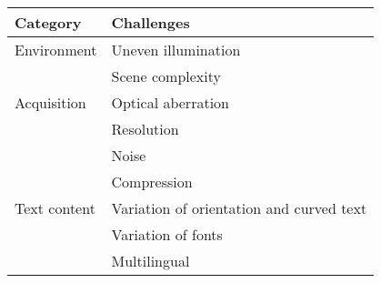 \begin{center} \label{Chalenges}
\begin{tabular}{|l|l|}
\hline 
\textbf{Category} &\textbf{Challenges} \\ 
\hline 
Environment &Uneven illumination \\ 
	\cline{2-2} 
 	&Scene complexity \\ 
\hline 
Acquisition &Optical aberration \\ 
 	\cline{2-2} 
	 &Resolution \\  	
 	\cline{2-2} 
	 &Noise \\ 	 
 	\cline{2-2} 
	 &Compression \\ 	 
\hline 
Text content &Variation of orientation and curved text \\ 
	\cline{2-2}  
	 &Variation of fonts \\ 
	\cline{2-2} 
 	&Multilingual\\ 
\hline 
\end{tabular} 
\end{center}

